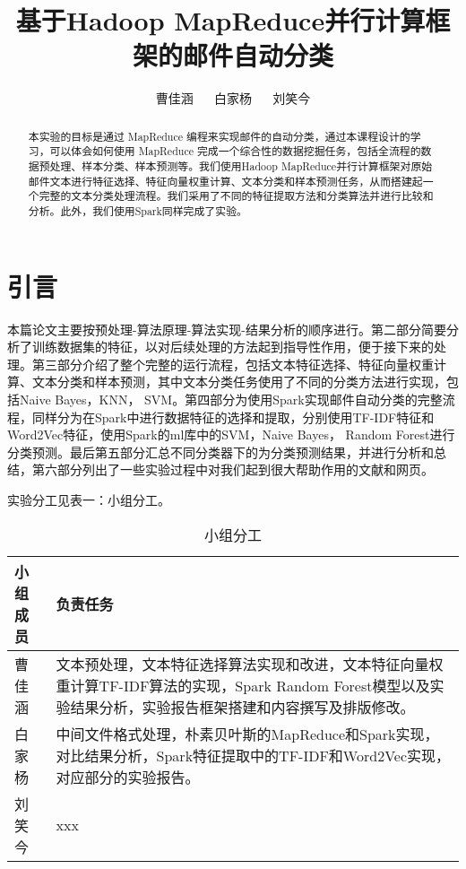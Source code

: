 \documentclass[lang=cn,11pt]{elegantpaper}
\title{基于Hadoop MapReduce并行计算框架的邮件自动分类}
\author{曹佳涵 $\quad$ 白家杨 $\quad$ 刘笑今}
\institute{2019st04小组}
\date{}
\begin{document}
\maketitle

\begin{abstract}
\noindent 本实验的目标是通过 MapReduce 编程来实现邮件的自动分类，通过本课程设计的学习，可以体会如何使用 MapReduce 完成一个综合性的数据挖掘任务，包括全流程的数据预处理、样本分类、样本预测等。我们使用Hadoop MapReduce并行计算框架对原始邮件文本进行特征选择、特征向量权重计算、文本分类和样本预测任务，从而搭建起一个完整的文本分类处理流程。我们采用了不同的特征提取方法和分类算法并进行比较和分析。此外，我们使用Spark同样完成了实验。
\end{abstract}

\tableofcontents

\section{引言}
本篇论文主要按预处理-算法原理-算法实现-结果分析的顺序进行。第二部分简要分析了训练数据集的特征，以对后续处理的方法起到指导性作用，便于接下来的处理。第三部分介绍了整个完整的运行流程，包括文本特征选择、特征向量权重计算、文本分类和样本预测，其中文本分类任务使用了不同的分类方法进行实现，包括Naive Bayes，KNN， SVM。第四部分为使用Spark实现邮件自动分类的完整流程，同样分为在Spark中进行数据特征的选择和提取，分别使用TF-IDF特征和Word2Vec特征，使用Spark的ml库中的SVM，Naive Bayes， Random Forest进行分类预测。最后第五部分汇总不同分类器下的为分类预测结果，并进行分析和总结，第六部分列出了一些实验过程中对我们起到很大帮助作用的文献和网页。

实验分工见表一：小组分工。
\begin{table}[!htb]
  \small
  \centering
  \caption{小组分工 \label{tab:reg}}
  \begin{tabular}{|p{2.5cm}|p{10cm}|}
    \toprule
    小组成员  &   负责任务  \\
    \hline
    曹佳涵 & 文本预处理，文本特征选择算法实现和改进，文本特征向量权重计算TF-IDF算法的实现，Spark Random Forest模型以及实验结果分析，实验报告框架搭建和内容撰写及排版修改。\\
    \hline
    白家杨 & 中间文件格式处理，朴素贝叶斯的MapReduce和Spark实现，对比结果分析，Spark特征提取中的TF-IDF和Word2Vec实现，对应部分的实验报告。 \\
    \hline
    刘笑今 & xxx \\
    \bottomrule
    \end{tabular}%
\end{table}%
\end{document}
